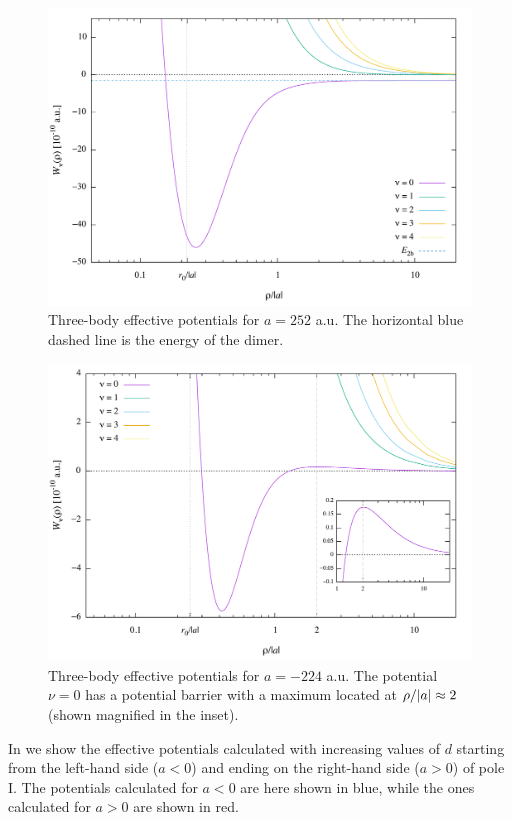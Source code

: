\begin{figure}
	\includegraphics[width=\linewidth]{Wpos2.pdf}
	\caption{Three-body effective potentials for $a=252$ a.u. The horizontal blue dashed line is the energy of the dimer.}
	\label{fig:Wpos}
\end{figure}

\begin{figure}
	\includegraphics[width=\linewidth]{Wneg2.pdf}
	\caption{Three-body effective potentials for $a=-224$ a.u. The potential $\nu = 0$ has a potential barrier with a maximum located at $\rho/\lvert a\rvert \approx 2$ (shown magnified in the inset).}
	\label{fig:Wneg}
\end{figure}

In  we show the effective potentials calculated with increasing values of $d$ starting from the left-hand side ($a<0$) and ending on the right-hand side ($a>0$) of pole $\mathrm{I}$. The potentials calculated for $a<0$ are here shown in blue, while the ones calculated for $a>0$ are shown in red. 

